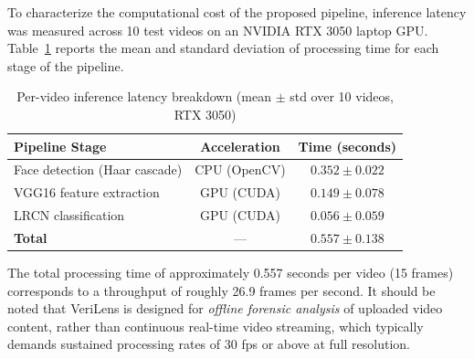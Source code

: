 To characterize the computational cost of the proposed pipeline, inference latency was measured across 10 test videos on an NVIDIA RTX 3050 laptop GPU. Table~\ref{tab:latency} reports the mean and standard deviation of processing time for each stage of the pipeline.

\begin{table}[h!]
\centering
\renewcommand{\arraystretch}{1.3}
\caption{Per-video inference latency breakdown (mean $\pm$ std over 10 videos, RTX 3050)}
\label{tab:latency}
\begin{tabular}{|l|c|c|}
\hline
\textbf{Pipeline Stage} & \textbf{Acceleration} & \textbf{Time (seconds)} \\
\hline
Face detection (Haar cascade) & CPU (OpenCV) & $0.352 \pm 0.022$ \\
\hline
VGG16 feature extraction & GPU (CUDA) & $0.149 \pm 0.078$ \\
\hline
LRCN classification & GPU (CUDA) & $0.056 \pm 0.059$ \\
\hline
\textbf{Total} & --- & $\mathbf{0.557 \pm 0.138}$ \\
\hline
\end{tabular}
\end{table}

\noindent The total processing time of approximately 0.557 seconds per video (15 frames) corresponds to a throughput of roughly 26.9 frames per second. It should be noted that VeriLens is designed for \textit{offline forensic analysis} of uploaded video content, rather than continuous real-time video streaming, which typically demands sustained processing rates of 30 fps or above at full resolution.








